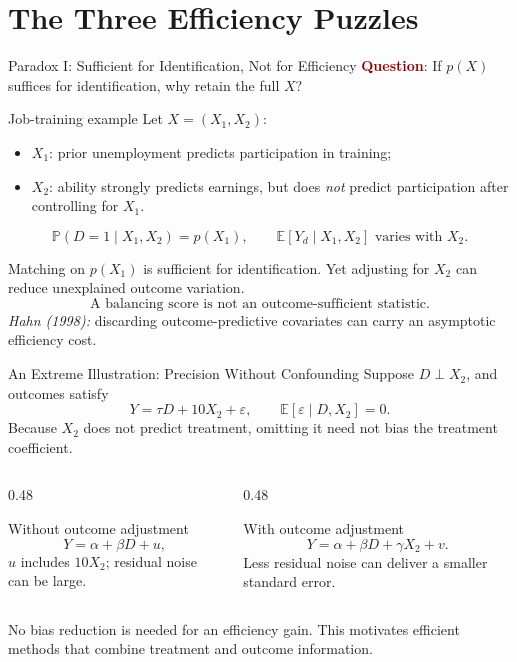 \documentclass[aspectratio=169,11pt]{beamer}
\newcommand{\E}{\mathbb{E}}
\newcommand{\Pp}{\mathbb{P}}
\newcommand{\Question}{\textcolor{DarkRed}{\textbf{Question}}}
\begin{document}
\section{The Three Efficiency Puzzles}
\begin{frame}{Paradox I: Sufficient for Identification, Not for Efficiency}
\small
\Question: If \(p(X)\) suffices for identification, why retain the full \(X\)?
\medskip
\begin{block}{Job-training example}
Let \(X=(X_1,X_2)\):
\begin{itemize}
\item \(X_1\): prior unemployment predicts participation in training;
\item \(X_2\): ability strongly predicts earnings, but does \emph{not} predict participation after controlling for \(X_1\).
\end{itemize}
\[
\Pp(D=1\mid X_1,X_2)=p(X_1),\qquad
\E[Y_d\mid X_1,X_2]\text{ varies with }X_2.
\]
\end{block}
\medskip
Matching on \(p(X_1)\) is sufficient for identification. Yet adjusting for \(X_2\) can reduce unexplained outcome variation.
\[
\boxed{\text{A balancing score is not an outcome-sufficient statistic.}}
\]
\textit{Hahn (1998):} discarding outcome-predictive covariates can carry an asymptotic efficiency cost.
\end{frame}

\begin{frame}{An Extreme Illustration: Precision Without Confounding}
\small
Suppose \(D\perp X_2\), and outcomes satisfy
\[
Y=\tau D+10X_2+\varepsilon,
\qquad \E[\varepsilon\mid D,X_2]=0.
\]
Because \(X_2\) does not predict treatment, omitting it need not bias the treatment coefficient.
\medskip
\begin{columns}[T]
\begin{column}{0.48\textwidth}
\begin{block}{Without outcome adjustment}
\[
Y=\alpha+\beta D+u,
\]
\(u\) includes \(10X_2\); residual noise can be large.
\end{block}
\end{column}
\begin{column}{0.48\textwidth}
\begin{block}{With outcome adjustment}
\[
Y=\alpha+\beta D+\gamma X_2+v.
\]
Less residual noise can deliver a smaller standard error.
\end{block}
\end{column}
\end{columns}
\medskip
\alert{No bias reduction is needed for an efficiency gain.} This motivates efficient methods that combine treatment and outcome information.
\end{frame}
\end{document}
